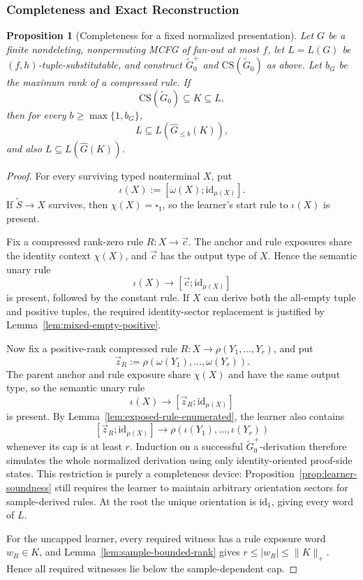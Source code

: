 \documentclass[11pt,a4paper]{article}
\numberwithin{equation}{section}
\theoremstyle{plain}
\newtheorem{proposition}[theorem]{Proposition}
\theoremstyle{definition}
\theoremstyle{remark}
\newcommand{\CS}{\mathrm{CS}}
\newcommand{\tuple}[1]{\vec{#1}}
\newcommand{\blank}{\square}
\begin{document}
\subsubsection{Completeness and Exact Reconstruction}
\label{sec:completeness}

\begin{proposition}[Completeness for a fixed normalized presentation]
\label{prop:completeness}
Let \(G\) be a finite nondeleting, nonpermuting MCFG of fan-out at most \(f\),
let \(L=L(G)\) be \((f,h)\)-tuple-substitutable, and construct
\(\widetilde G_0^+\) and \(\CS(\widetilde G_0)\) as above.  Let \(b_G\) be
the maximum rank of a compressed rule.  If
\[
  \CS(\widetilde G_0)\subseteq K\subseteq L,
\]
then for every \(b\ge\max\{1,b_G\}\),
\[
  L\subseteq L(\widehat G_{\le b}(K)),
\]
and also \(L\subseteq L(\widehat G(K))\).
\end{proposition}

\begin{proof}
For every surviving typed nonterminal \(X\), put
\[
  \iota(X):=[\omega(X);\mathrm{id}_{\mu(X)}].
\]
If \(\widetilde S\to X\) survives, then \(\chi(X)=\blank_1\), so the learner's
start rule to \(\iota(X)\) is present.

Fix a compressed rank-zero rule \(R:X\to\tuple c\).  The anchor and rule
exposures share the identity context \(\chi(X)\), and \(\tuple c\) has the
output type of \(X\).  Hence the semantic unary rule
\[
  \iota(X)\to[\tuple c;\mathrm{id}_{\mu(X)}]
\]
is present, followed by the constant rule.  If \(X\) can derive both the
all-empty tuple and positive tuples, the required identity-sector replacement
is justified by Lemma~\ref{lem:mixed-empty-positive}.

Now fix a positive-rank compressed rule
\(R:X\to\rho(Y_1,\ldots,Y_r)\), and put
\[
  \tuple z_R:=\rho(\omega(Y_1),\ldots,\omega(Y_r)).
\]
The parent anchor and rule exposure share \(\chi(X)\) and have the same output
type, so the semantic unary rule
\[
  \iota(X)\to[\tuple z_R;\mathrm{id}_{\mu(X)}]
\]
is present.  By Lemma~\ref{lem:exposed-rule-enumerated}, the learner also
contains
\[
  [\tuple z_R;\mathrm{id}_{\mu(X)}]\to
  \rho(\iota(Y_1),\ldots,\iota(Y_r))
\]
whenever its cap is at least \(r\).  Induction on a successful
\(\widetilde G_0^+\)-derivation therefore simulates the whole normalized
derivation using only identity-oriented proof-side states.  This restriction
is purely a completeness device: Proposition~\ref{prop:learner-soundness}
still requires the learner to maintain arbitrary orientation sectors for
sample-derived rules.  At the root the unique orientation is
\(\mathrm{id}_1\), giving every word of \(L\).

For the uncapped learner, every required witness has a rule exposure word
\(w_R\in K\), and Lemma~\ref{lem:sample-bounded-rank} gives
\(r\le|w_R|\le\|K\|_+\).  Hence all required witnesses lie below the
sample-dependent cap.
\end{proof}
\end{document}
